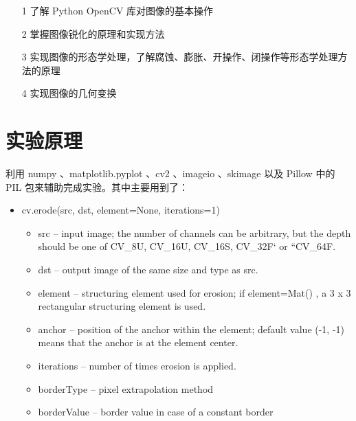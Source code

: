 \documentclass[11pt]{ctexart}
\begin{document}
\begin{itemize}
    \item [1] 了解 Python OpenCV 库对图像的基本操作
    \item [2] 掌握图像锐化的原理和实现方法
    \item [3] 实现图像的形态学处理，了解腐蚀、膨胀、开操作、闭操作等形态学处理方法的原理
    \item [4] 实现图像的几何变换
\end{itemize}

\section{实验原理}

利用 numpy 、matplotlib.pyplot 、cv2 、imageio 、skimage 以及 Pillow 中的 PIL 包来辅助完成实验。其中主要用到了：

\begin{itemize}
    \item cv.erode(src, dst, element=None, iterations=1)
    \begin{itemize}
        \item src – input image; the number of channels can be arbitrary, but the depth should be one of CV\_8U, CV\_16U, CV\_16S, CV\_32F` or ``CV\_64F.
        \item dst – output image of the same size and type as src.
        \item element – structuring element used for erosion; if element=Mat() , a 3 x 3 rectangular structuring element is used.
        \item anchor – position of the anchor within the element; default value (-1, -1) means that the anchor is at the element center.
        \item iterations – number of times erosion is applied.
        \item borderType – pixel extrapolation method
        \item borderValue – border value in case of a constant border
    \end{itemize}
\end{itemize}
\end{document}
